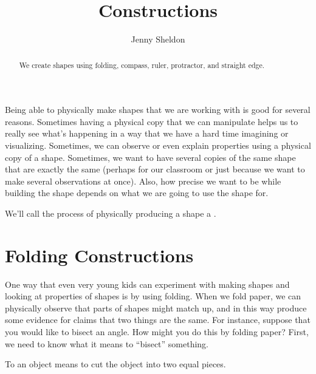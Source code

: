 \documentclass{ximera}
\title{Constructions}
\author{Jenny Sheldon}
\begin{document}
\begin{abstract}
We create shapes using folding, compass, ruler, protractor, and straight edge.
\end{abstract}
\maketitle

Being able to physically make shapes that we are working with is good for several reasons. Sometimes having a physical copy that we can manipulate helps us to really see what's happening in a way that we have a hard time imagining or visualizing. Sometimes, we can observe or even explain properties using a physical copy of a shape. Sometimes, we want to have several copies of the same shape that are exactly the same (perhaps for our classroom or just because we want to make several observations at once). Also, how precise we want to be while building the shape depends on what we are going to use the shape for.

We'll call the process of physically producing a shape a .

\section{Folding Constructions}
One way that even very young kids can experiment with making shapes and looking at properties of shapes is by using folding. When we fold paper, we can physically observe that parts of shapes might match up, and in this way produce some evidence for claims that two things are the same. For instance, suppose that you would like to bisect an angle. How might you do this by folding paper? First, we need to know what it means to ``bisect'' something.

\begin{definition}
To  an object means to cut the object into two equal pieces.
\end{definition}
\end{document}
